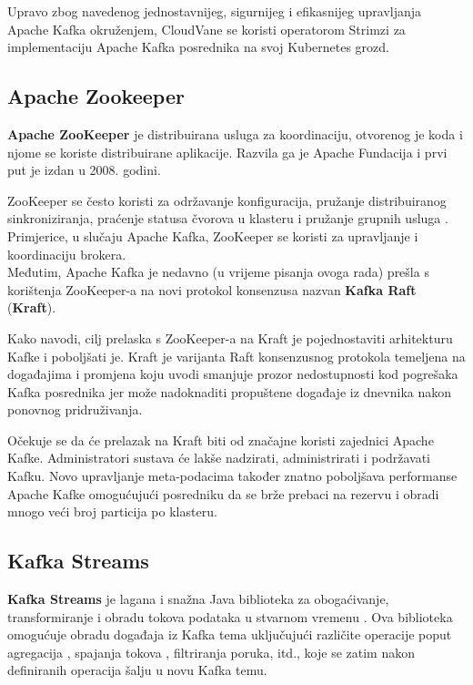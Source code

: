 \documentclass[times, utf8, diplomski]{fer}
\begin{document}
Upravo zbog navedenog jednostavnijeg, sigurnijeg i efikasnijeg upravljanja Apache Kafka okruženjem, CloudVane se koristi operatorom Strimzi za implementaciju Apache Kafka posrednika na svoj Kubernetes grozd.

\subsection{Apache Zookeeper}

\textbf{Apache ZooKeeper} je distribuirana usluga za koordinaciju, otvorenog je koda i njome se koriste distribuirane aplikacije. Razvila ga je Apache Fundacija i prvi put je izdan u 2008. godini.

ZooKeeper se često koristi za održavanje konfiguracija, pružanje distribuiranog sinkroniziranja, praćenje statusa čvorova u klasteru i pružanje grupnih usluga \citep{hunt_zookeeper_2010}. Primjerice, u slučaju Apache Kafka, ZooKeeper se koristi za upravljanje i koordinaciju brokera.\\

Međutim, Apache Kafka je nedavno (u vrijeme pisanja ovoga rada) prešla s korištenja ZooKeeper-a na novi protokol konsenzusa nazvan \textbf{Kafka Raft} (\textbf{Kraft}).

Kako \citet{chandrakant_kafkas_2022} navodi, cilj prelaska s ZooKeeper-a na Kraft je pojednostaviti arhitekturu Kafke i poboljšati je. Kraft je varijanta Raft konsenzusnog protokola temeljena na događajima i promjena koju uvodi smanjuje prozor nedostupnosti kod pogrešaka Kafka posrednika jer može nadoknaditi propuštene događaje iz dnevnika nakon ponovnog pridruživanja. 

Očekuje se da će prelazak na Kraft biti od značajne koristi zajednici Apache Kafke. Administratori sustava će lakše nadzirati, administrirati i podržavati Kafku. Novo upravljanje meta-podacima također znatno poboljšava performanse Apache Kafke omogućujući posredniku da se brže prebaci na rezervu i obradi mnogo veći broj particija po klasteru.

\clearpage
\subsection{Kafka Streams}
\label{sec:kstream}

\textbf{Kafka Streams} je lagana i snažna Java biblioteka za obogaćivanje, transformiranje i obradu tokova podataka u stvarnom vremenu \citep{seymour_mastering_2021}. Ova biblioteka omogućuje obradu događaja iz Kafka tema uključujući različite operacije poput agregacija , spajanja tokova , filtriranja poruka, itd., koje se zatim nakon definiranih operacija šalju u novu Kafka temu.\\
\end{document}

